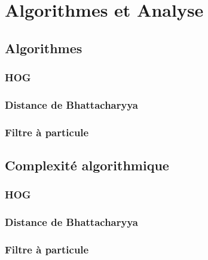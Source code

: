 \chapter{Algorithmes et Analyse}

\section{Algorithmes}

\subsection{HOG}

\subsection{Distance de Bhattacharyya}

\subsection{Filtre à particule}

\section{Complexité algorithmique}

\subsection{HOG}

\subsection{Distance de Bhattacharyya}

\subsection{Filtre à particule}

\clearpage